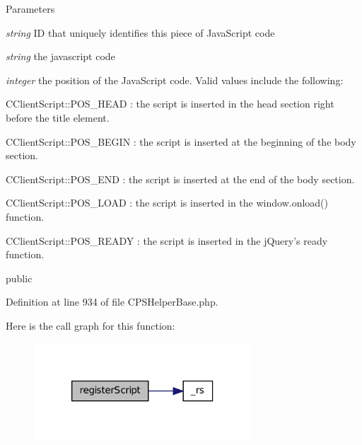 \begin{DoxyParams}{Parameters}
\item[{\em string}]ID that uniquely identifies this piece of JavaScript code \item[{\em string}]the javascript code \item[{\em integer}]the position of the JavaScript code. Valid values include the following: 
\begin{DoxyItemize}
\item CClientScript::POS\_\-HEAD : the script is inserted in the head section right before the title element. 
\item CClientScript::POS\_\-BEGIN : the script is inserted at the beginning of the body section. 
\item CClientScript::POS\_\-END : the script is inserted at the end of the body section. 
\item CClientScript::POS\_\-LOAD : the script is inserted in the window.onload() function. 
\item CClientScript::POS\_\-READY : the script is inserted in the jQuery's ready function. 
\end{DoxyItemize}public \end{DoxyParams}


Definition at line 934 of file CPSHelperBase.php.








Here is the call graph for this function:\nopagebreak
\begin{figure}[H]
\begin{center}
\leavevmode
\includegraphics[width=230pt]{classCPSHelperBase_a9fcce4225d8f12cbd7edcf81b27b8f42_cgraph}
\end{center}
\end{figure}


